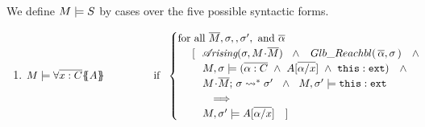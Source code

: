 \begin{definition}%

We define $M \models {S}$ by cases over the five possible syntactic forms.

\label{def:necessity-semantics}

\begin{enumerate}
 \item
 $\satisfies{M}{\TwoStatesN {\overline {x:C}} {A}} \  \ \ \ \ \ \ \ \ \ \ \ \ \ \mbox{if}  \   \
    \begin{cases}
     \mbox{for all }   \Mtwo,  \sigma, , \sigma', \mbox{ and }  \overline{\alpha}    \\
 \ \ \ \  [ \ \ { \arising{\sigma}{M\madd \Mtwo }\   \  \wedge\ \ \GRelevant {\overline \alpha}  \sigma}\ \ \ \wedge  \\
  \ \ \ \  \ \ \  \satisfiesA {M}   {\sigma}  {(\overline {\alpha :C} \ \wedge\  {A[\overline{\alpha/x}]}\ \wedge \  {\external{\prg{this}}}) } \ \ \ \wedge   \\
 \ \ \ \   \ \ \ {\leadstoBoundedStar {M\madd \Mtwo}{\sigma}  {\sigma'} } \ \ \wedge\ \  M, \sigma' \models {\external{\prg{this}}}  \\
 \ \ \ \   \ \ \ \ \  \ \Longrightarrow   \\
 \ \ \ \   \ \ \  {\satisfiesA{M}{\sigma'}{ A[\overline{\alpha/x}]}  }  \ \ \  ]  
     \end{cases} 
 $

\end{enumerate}
\end{definition}
